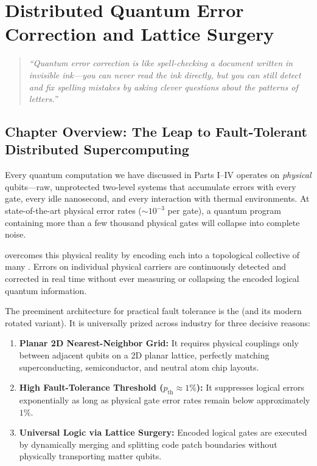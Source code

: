 \chapter{Distributed Quantum Error Correction and Lattice Surgery}
\label{ch:distributed_qec}

\begin{quote}
\textit{``Quantum error correction is like spell-checking a document written in invisible ink---you can never read the ink directly, but you can still detect and fix spelling mistakes by asking clever questions about the patterns of letters.''}
\end{quote}

\section*{Chapter Overview: The Leap to Fault-Tolerant Distributed Supercomputing}

Every quantum computation we have discussed in Parts I--IV operates on \textit{physical} qubits---raw, unprotected two-level systems that accumulate errors with every gate, every idle nanosecond, and every interaction with thermal environments. At state-of-the-art physical error rates ($\sim 10^{-3}$ per gate), a quantum program containing more than a few thousand physical gates will collapse into complete noise.

 overcomes this physical reality by encoding each  into a topological collective of many . Errors on individual physical carriers are continuously detected and corrected in real time without ever measuring or collapsing the encoded logical quantum information.

The preeminent architecture for practical fault tolerance is the  (and its modern rotated variant). It is universally prized across industry for three decisive reasons:
\begin{enumerate}
    \item \textbf{Planar 2D Nearest-Neighbor Grid:} It requires physical couplings only between adjacent qubits on a 2D planar lattice, perfectly matching superconducting, semiconductor, and neutral atom chip layouts.
    \item \textbf{High Fault-Tolerance Threshold ($p_{\text{th}} \approx 1\%$):} It suppresses logical errors exponentially as long as physical gate error rates remain below approximately $1\%$.
    \item \textbf{Universal Logic via Lattice Surgery:} Encoded logical gates are executed by dynamically merging and splitting code patch boundaries without physically transporting matter qubits.
\end{enumerate}

